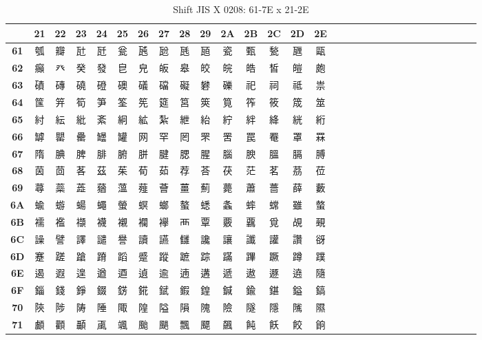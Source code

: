 \begin{table}[H]
\centering
\caption{Shift JIS X 0208: 61-7E x 21-2E}
\begin{tabular}{|Sc|Sc|Sc|Sc|Sc|Sc|Sc|Sc|Sc|Sc|Sc|Sc|Sc|Sc|Sc|}
\hline
 & \textbf{21} & \textbf{22} & \textbf{23} & \textbf{24} & \textbf{25} & \textbf{26} & \textbf{27} & \textbf{28} & \textbf{29} & \textbf{2A} & \textbf{2B} & \textbf{2C} & \textbf{2D} & \textbf{2E} \\ \hline
\textbf{61} & 瓠 & 瓣 & 瓧 & 瓩 & 瓮 & 瓲 & 瓰 & 瓱 & 瓸 & 瓷 & 甄 & 甃 & 甅 & 甌 \\ \hline
\textbf{62} & 癲 & 癶 & 癸 & 發 & 皀 & 皃 & 皈 & 皋 & 皎 & 皖 & 皓 & 皙 & 皚 & 皰 \\ \hline
\textbf{63} & 磧 & 磚 & 磽 & 磴 & 礇 & 礒 & 礑 & 礙 & 礬 & 礫 & 祀 & 祠 & 祗 & 祟 \\ \hline
\textbf{64} & 筺 & 笄 & 筍 & 笋 & 筌 & 筅 & 筵 & 筥 & 筴 & 筧 & 筰 & 筱 & 筬 & 筮 \\ \hline
\textbf{65} & 紂 & 紜 & 紕 & 紊 & 絅 & 絋 & 紮 & 紲 & 紿 & 紵 & 絆 & 絳 & 絖 & 絎 \\ \hline
\textbf{66} & 罅 & 罌 & 罍 & 罎 & 罐 & 网 & 罕 & 罔 & 罘 & 罟 & 罠 & 罨 & 罩 & 罧 \\ \hline
\textbf{67} & 隋 & 腆 & 脾 & 腓 & 腑 & 胼 & 腱 & 腮 & 腥 & 腦 & 腴 & 膃 & 膈 & 膊 \\ \hline
\textbf{68} & 茵 & 茴 & 茖 & 茲 & 茱 & 荀 & 茹 & 荐 & 荅 & 茯 & 茫 & 茗 & 茘 & 莅 \\ \hline
\textbf{69} & 蕁 & 蘂 & 蕋 & 蕕 & 薀 & 薤 & 薈 & 薑 & 薊 & 薨 & 蕭 & 薔 & 薛 & 藪 \\ \hline
\textbf{6A} & 蝓 & 蝣 & 蝪 & 蠅 & 螢 & 螟 & 螂 & 螯 & 蟋 & 螽 & 蟀 & 蟐 & 雖 & 螫 \\ \hline
\textbf{6B} & 襦 & 襤 & 襭 & 襪 & 襯 & 襴 & 襷 & 襾 & 覃 & 覈 & 覊 & 覓 & 覘 & 覡 \\ \hline
\textbf{6C} & 譟 & 譬 & 譯 & 譴 & 譽 & 讀 & 讌 & 讎 & 讒 & 讓 & 讖 & 讙 & 讚 & 谺 \\ \hline
\textbf{6D} & 蹇 & 蹉 & 蹌 & 蹐 & 蹈 & 蹙 & 蹤 & 蹠 & 踪 & 蹣 & 蹕 & 蹶 & 蹲 & 蹼 \\ \hline
\textbf{6E} & 遏 & 遐 & 遑 & 遒 & 逎 & 遉 & 逾 & 遖 & 遘 & 遞 & 遨 & 遯 & 遶 & 隨 \\ \hline
\textbf{6F} & 錙 & 錢 & 錚 & 錣 & 錺 & 錵 & 錻 & 鍜 & 鍠 & 鍼 & 鍮 & 鍖 & 鎰 & 鎬 \\ \hline
\textbf{70} & 陝 & 陟 & 陦 & 陲 & 陬 & 隍 & 隘 & 隕 & 隗 & 險 & 隧 & 隱 & 隲 & 隰 \\ \hline
\textbf{71} & 顱 & 顴 & 顳 & 颪 & 颯 & 颱 & 颶 & 飄 & 飃 & 飆 & 飩 & 飫 & 餃 & 餉 \\ \hline

\end{tabular}
\end{table}
